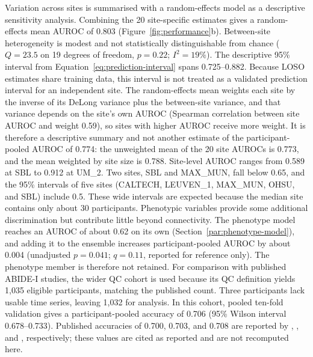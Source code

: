 Variation across sites is summarised with a random-effects model as a descriptive sensitivity analysis. Combining the 20 site-specific estimates gives a random-effects mean AUROC of 0.803 (Figure~\ref{fig:performance}b). Between-site heterogeneity is modest and not statistically distinguishable from chance ($Q=23.5$ on 19 degrees of freedom, $p=0.22$; $I^2=19\%$). The descriptive 95\% interval from Equation~\eqref{eq:prediction-interval} spans 0.725--0.882. Because LOSO estimates share training data, this interval is not treated as a validated prediction interval for an independent site. The random-effects mean weights each site by the inverse of its DeLong variance plus the between-site variance, and that variance depends on the site's own AUROC (Spearman correlation between site AUROC and weight 0.59), so sites with higher AUROC receive more weight. It is therefore a descriptive summary and not another estimate of the participant-pooled AUROC of 0.774: the unweighted mean of the 20 site AUROCs is 0.773, and the mean weighted by site size is 0.788. Site-level AUROC ranges from 0.589 at SBL to 0.912 at UM\_2. Two sites, SBL and MAX\_MUN, fall below 0.65, and the 95\% intervals of five sites (CALTECH, LEUVEN\_1, MAX\_MUN, OHSU, and SBL) include 0.5. These wide intervals are expected because the median site contains only about 30 participants. Phenotypic variables provide some additional discrimination but contribute little beyond connectivity. The phenotype model reaches an AUROC of about 0.62 on its own (Section~\ref{par:phenotype-model}), and adding it to the ensemble increases participant-pooled AUROC by about 0.004 (unadjusted $p=0.041$; $q=0.11$, reported for reference only). The phenotype member is therefore not retained. For comparison with published ABIDE-I studies, the wider QC cohort is used because its QC definition yields 1,035 eligible participants, matching the published count. Three participants lack usable time series, leaving 1,032 for analysis. In this cohort, pooled ten-fold validation gives a participant-pooled accuracy of 0.706 (95\% Wilson interval 0.678--0.733). Published accuracies of 0.700, 0.703, and 0.708 are reported by \citet{Heinsfeldetal2018}, \citet{Eslamietal2019}, and \citet{AlmuqhimSaeed2021}, respectively; these values are cited as reported and are not recomputed here.

